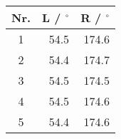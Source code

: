 \begin{tabular}{c|rr}
Nr. & L / ${}^\circ$ & R / ${}^\circ$ \\
\hline
1 & 54.5 & 174.6\\
2 & 54.4 & 174.7\\
3 & 54.5 & 174.5\\
4 & 54.5 & 174.6\\
5 & 54.4 & 174.6
\end{tabular}